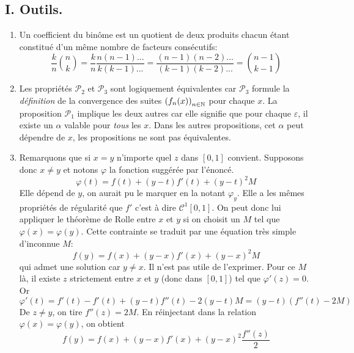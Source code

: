 \subsection*{I. Outils.}
\begin{enumerate}
 \item Un coefficient du binôme est un quotient de deux produits chacun étant constitué d'un même nombre de facteurs consécutifs:
\begin{displaymath}
 \frac{k}{n}\binom{n}{k} = \frac{k}{n} \frac{n(n-1)...}{k(k-1)...} = \frac{(n-1)(n-2)...}{(k-1)(k-2)...}
=\binom{n-1}{k-1} 
\end{displaymath}

 \item Les propriétés $\mathcal{P}_2$ et $\mathcal{P}_3$ sont logiquement équivalentes car $\mathcal{P}_3$ formule la \emph{définition} de la convergence des suites $\left( f_n(x)\right) _{n\in \mathbb{N}}$ pour chaque $x$.\newline
La proposition $\mathcal{P}_1$ implique les deux autres car elle signifie que pour chaque $\varepsilon$, il existe un $\alpha$ valable pour \emph{tous} les $x$. Dans les autres propositions, cet $\alpha$ peut dépendre de $x$, les propositions ne sont pas équivalentes.
   
 \item Remarquons que si $x=y$ n'importe quel $z$ dans $[0,1]$ convient. Supposons donc $x\neq y$ et  notons $\varphi$ la fonction suggérée par l'énoncé.
\begin{displaymath}
 \varphi(t) = f(t)+(y-t)f'(t) + (y-t)^2M
\end{displaymath}
Elle dépend de $y$, on aurait pu le marquer en la notant $\varphi_y$.  Elle a les mêmes propriétés de régularité que $f'$ c'est à dire $\mathcal{C}^1[0,1]$. On peut donc lui appliquer le théorème de Rolle entre $x$ et $y$ si on choisit un $M$ tel que $\varphi(x)=\varphi(y)$.\newline
Cette contrainte se traduit par une équation très simple d'inconnue $M$:
\begin{displaymath}
 f(y) = f(x)+(y-x)f'(x) + (y-x)^2M 
\end{displaymath}
 qui admet une solution car $y\neq x$. Il n'est pas utile de l'exprimer.\newline
Pour ce $M$ là, il existe $z$ strictement entre $x$ et $y$ (donc dans $[0,1]$) tel que $\varphi'(z)=0$. Or
\begin{displaymath}
 \varphi'(t) = f'(t)-f'(t)+(y-t)f''(t)-2(y-t)M =(y-t)(f''(t)-2M)
\end{displaymath}
De $z\neq y$, on tire $f''(z) = 2M$. En réinjectant dans la relation $\varphi(x)=\varphi(y)$, on obtient
\begin{displaymath}
 f(y) = f(x)+(y-x)f'(x) + (y-x)^2\frac{f''(z)}{2} 
\end{displaymath}


\end{enumerate}
